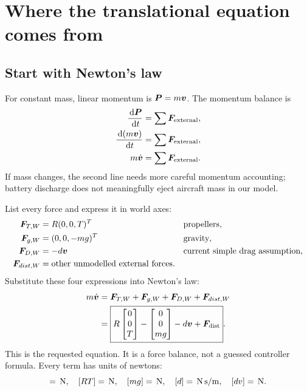 \chapter{Where the translational equation comes from}
\section{Start with Newton's law}
For constant mass, linear momentum is $\bm{P}=m\bm{v}$. The momentum balance is
\begin{align}
\frac{\,\mathrm d\bm{P}}{\,\mathrm d t}&=\sum\bm{F}_{\rm external},\\
\frac{\,\mathrm d(m\bm{v})}{\,\mathrm d t}&=\sum\bm{F}_{\rm external},\\
m\dot{\bm{v}}&=\sum\bm{F}_{\rm external}.
\end{align}
If mass changes, the second line needs more careful momentum accounting; battery
discharge does not meaningfully eject aircraft mass in our model.

List every force and express it in world axes:
\begin{align}
\bm{F}_{T,W}&=R(0,0,T)^T&&\text{propellers},\\
\bm{F}_{g,W}&=(0,0,-mg)^T&&\text{gravity},\\
\bm{F}_{D,W}&=-d\bm{v}&&\text{current simple drag assumption},\\
\bm{F}_{{dist},W}&=\text{other unmodelled external forces}.
\end{align}
Substitute these four expressions into Newton's law:
\begin{align}
m\dot{\bm{v}}
&=\bm{F}_{T,W}+\bm{F}_{g,W}+\bm{F}_{D,W}+\bm{F}_{{dist},W}\\
&=\boxed{R\begin{bmatrix}0\\0\\T\end{bmatrix}
-\begin{bmatrix}0\\0\\mg\end{bmatrix}
-d\bm{v}+\bm{F}_{\rm dist}}.
\end{align}
This is the requested equation. It is a force balance, not a guessed controller
formula. Every term has units of newtons:
\begin{equation}
[m\dot v]=\unit N,\quad [RT]=\unit N,\quad [mg]=\unit N,\quad
[d]=\unit{N\,s/m},\quad[dv]=\unit N.
\end{equation}


